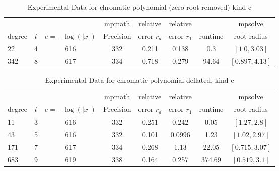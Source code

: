 \documentclass[sigconf]{acmart}
\begin{document}
\begin{table}[t]
\caption{Experimental Data for chromatic polynomial (zero root removed) kind c}
\label{tab:chrmc}
\vskip -0.15in
\begin{center}
\begin{small}
\begin{sc}
\begin{tabular}{lccccccc}
\toprule
&  &  & mpmath & relative  & relative &  & mpsolve \\
degree  & $l$& $e=-\log(|x|)$& Precision &error $r_d$       & error $r_1$ &runtime& root radius\\
\midrule 
 22 & 4 & 616 & 332 & 0.211 & 0.138 & 0.3 & $[1.0, 3.03]$\\
 342 & 8 & 617 & 334 & 0.718 & 0.279 & 94.64 & $[0.897, 4.13]$\\
\bottomrule
\end{tabular}
\end{sc}
\end{small}
\end{center}
\vskip 0.05in
\end{table}


\begin{table}[t]
\caption{Experimental Data for chromatic polynomial deflated, kind c}
\label{tab:chrmc_d}
\vskip -0.15in
\begin{center}
\begin{small}
\begin{sc}
\begin{tabular}{lccccccc}
\toprule
&  &  & mpmath & relative  & relative &  & mpsolve \\
degree  & $l$& $e=-\log(|x|)$& Precision &error $r_d$       & error $r_1$ &runtime& root radius\\
\midrule
11 & 3 & 616 & 332 & 0.251 & 0.242 & 0.05 & $[1.27, 2.8]$\\
 43 & 5 & 616 & 332 & 0.101 & 0.0996 & 1.23 & $[1.02, 2.97]$\\
 171 & 7 & 617 & 334 & 0.268 & 1.13 & 22.05 & $[0.715, 3.07]$\\
 683 & 9 & 619 & 338 & 0.164 & 0.257 & 374.69 & $[0.519, 3.1]$\\
\bottomrule
\end{tabular}
\end{sc}
\end{small}
\end{center}
\vskip 0.05in
\end{table}
\end{document}
